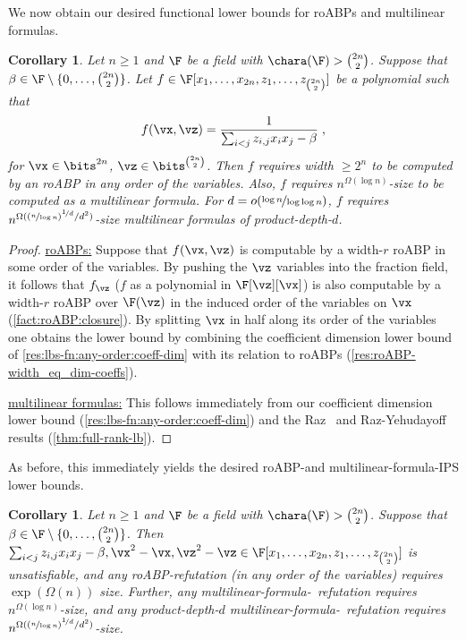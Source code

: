 \documentclass[11pt]{article}
\numberwithin{equation}{section}
\newtheorem{corollary}[theorem]{Corollary}
\theoremstyle{definition}
\theoremstyle{plain}
\begin{document}
We now obtain our desired functional lower bounds for roABPs and multilinear formulas.

\begin{corollary}\label{res:lbs-fn:any-order}
        Let $n\ge 1$ and $\F$ be a field with $\chara(\F)>\binom{2n}{2}$.  Suppose that $\beta\in\F\setminus\{0,\ldots,\binom{2n}{2}\}$.  Let $f\in\F[x_1,\ldots,x_{2n},z_1,\ldots,z_{\binom{2n}{2}}]$ be a polynomial such that
        \[
                f(\vx,\vz)=\frac{1}{\sum_{i<j} z_{i,j}x_ix_j-\beta}
                \;,
        \]
        for $\vx\in\bits^{2n}$, $\vz\in\bits^{\binom{2n}{2}}$. Then $f$ requires width $\ge 2^n$ to be computed by an roABP in any order of the variables.  Also, $f$ requires $n^{\Omega(\log n)}$-size to be computed as a multilinear formula.  For $d=o(\nicefrac{\log n}{\log\log n})$, $f$ requires $n^{\Omega((\nicefrac{n}{\log n})^{\nicefrac{1}{d}}/d^2)}$-size multilinear formulas of product-depth-$d$.
\end{corollary}
\begin{proof}
        \uline{roABPs:}  Suppose that $f(\vx,\vz)$ is computable by a width-$r$ roABP in some order of the variables.  By pushing the $\vz$ variables into the fraction field, it follows that $f_\vz$ ($f$ as a polynomial in $\F[\vz][\vx]$) is also computable by a width-$r$ roABP over $\F(\vz)$ in the induced order of the variables on $\vx$ (\autoref{fact:roABP:closure}).  By splitting $\vx$ in half along its order of the variables one obtains the lower bound by combining the coefficient dimension lower bound of \autoref{res:lbs-fn:any-order:coeff-dim} with its relation to roABPs (\autoref{res:roABP-width_eq_dim-coeffs}).

        \uline{multilinear formulas:} This follows immediately from our coefficient dimension lower bound (\autoref{res:lbs-fn:any-order:coeff-dim}) and the Raz~\cite{Raz09} and Raz-Yehudayoff~\cite{RazYehudayoff09} results (\autoref{thm:full-rank-lb}).
\end{proof}

As before, this immediately yields the desired roABP-\lIPS and multilinear-formula-IPS lower bounds.


\begin{corollary}\label{res:lbs-fn:lbs-ips:vary-order}
  Let $n\ge 1$ and $\F$ be a field with $\chara(\F)>\binom{2n}{2}$.  Suppose that $\beta\in\F\setminus\{0,\ldots,\binom{2n}{2}\}$.  Then $\sum_{i<j} z_{i,j}x_ix_j-\beta,\vx^2-\vx,\vz^2-\vz\in\F[x_1,\ldots,x_{2n},z_1,\ldots,z_{\binom{2n}{2}}]$ is unsatisfiable, and any roABP-\lIPS refutation (in any order of the variables) requires
%
 $\exp(\Omega(n))$ size.   %
Further, any multilinear-formula-\IPS\ refutation requires $n^{\Omega(\log n)}$-size, and any product-depth-$d$ multilinear-formula-\IPS\ refutation requires $n^{\Omega((\nicefrac{n}{\log n})^{\nicefrac{1}{d}}/d^2)}$-size.
\end{corollary}
\end{document}
